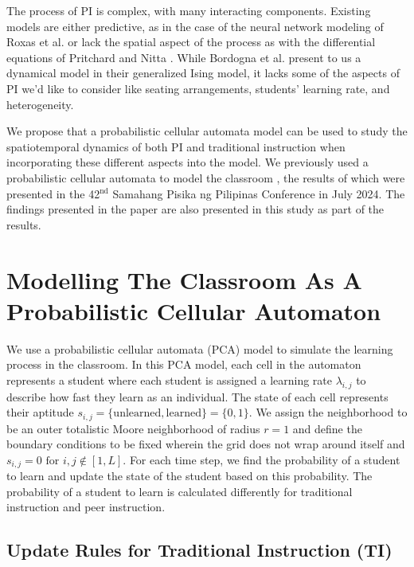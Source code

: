 \documentclass[twocolumn,secnumarabic,amssymb, nobibnotes, aps, prd]{revtex4-2}
\begin{document}
    The process of PI is complex, with many interacting components.
    Existing models are either predictive, as in the case of the neural network modeling of Roxas et al. \cite{roxas2010seating} or lack the spatial aspect of the process as with the differential equations of Pritchard \cite{pritchard2008mathematical} and Nitta \cite{nitta2019mathematical}.
    While Bordogna et al. \cite{bordogna2001theoretical,bordogna2003simulation} present to us a dynamical model in their generalized Ising model, it lacks some of the aspects of PI we'd like to consider like seating arrangements, students' learning rate, and heterogeneity.

    We propose that a probabilistic cellular automata model can be used to study the spatiotemporal dynamics of both PI and traditional instruction when incorporating these different aspects into the model.
    We previously used a probabilistic cellular automata to model the classroom \cite{SelfSPP}, the results of which were presented in the 42$^{\text{nd}}$ Samahang Pisika ng Pilipinas Conference in July 2024.
    The findings presented in the paper are also presented in this study as part of the results.

\section{Modelling The Classroom As A Probabilistic Cellular Automaton}

    We use a probabilistic cellular automata (PCA) model to simulate the learning process in the classroom.
    In this PCA model, each cell in the automaton represents a student where each student is assigned a learning rate $\lambda_{i,j}$ to describe how fast they learn as an individual.
    The state of each cell represents their aptitude $s_{i,j}=\lbrace\text{unlearned},\text{learned}\rbrace=\lbrace0,1\rbrace$.
    We assign the neighborhood to be an outer totalistic Moore neighborhood of radius $r=1$ and define the boundary conditions to be fixed wherein the grid does not wrap around itself and $s_{i,j}=0 \text{ for }i,j\notin[1,L]$.
    For each time step, we find the probability of a student to learn and update the state of the student based on this probability.
    The probability of a student to learn is calculated differently for traditional instruction and peer instruction.

    \subsection{Update Rules for Traditional Instruction (TI)}
\end{document}
